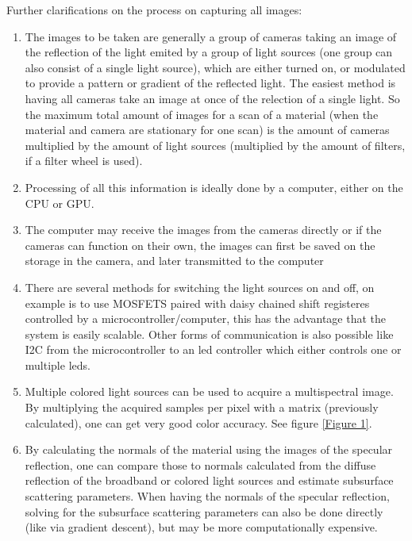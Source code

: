 \documentclass[11pt, twoside, listof=totocnumbered, bibliography=totocnumbered]{scrartcl}
\newcommand{\br}{\hfill\\}
\begin{document}
Further clarifications on the process on capturing all images:
\begin{enumerate}
	\item The images to be taken are generally a group of cameras taking an image of the reflection of the light emited by a group of light sources (one group can also consist of a single light source), which are either turned on, or modulated to provide a pattern or gradient of the reflected light. The easiest method is having all cameras take an image at once of the relection of a single light. So the maximum total amount of images for a scan of a material (when the material and camera are stationary for one scan) is the amount of cameras multiplied by the amount of light sources (multiplied by the amount of filters, if a filter wheel is used).
	\item Processing of all this information is ideally done by a computer, either on the CPU or GPU.
	\item The computer may receive the images from the cameras directly or if the cameras can function on their own, the images can first be saved on the storage in the camera, and later transmitted to the computer
	\item There are several methods for switching the light sources on and off, on example is to use MOSFETS paired with daisy chained shift registeres controlled by a microcontroller/computer, this has the advantage that the system is easily scalable. Other forms of communication is also possible like I2C from the microcontroller to an led controller which either controls one or multiple leds.
	\item Multiple colored light sources can be used to acquire a multispectral image. By multiplying the acquired samples per pixel with a matrix (previously calculated), one can get very good color accuracy. See figure \ref{Figure 1}.
	\item By calculating the normals of the material using the images of the specular reflection, one can compare those to normals calculated from the diffuse reflection of the broadband or colored light sources and estimate subsurface scattering parameters. When having the normals of the specular reflection, solving for the subsurface scattering parameters can also be done directly (like via gradient descent), but may be more computationally expensive. \cite{SSS}
\end{enumerate}\br
\end{document}
